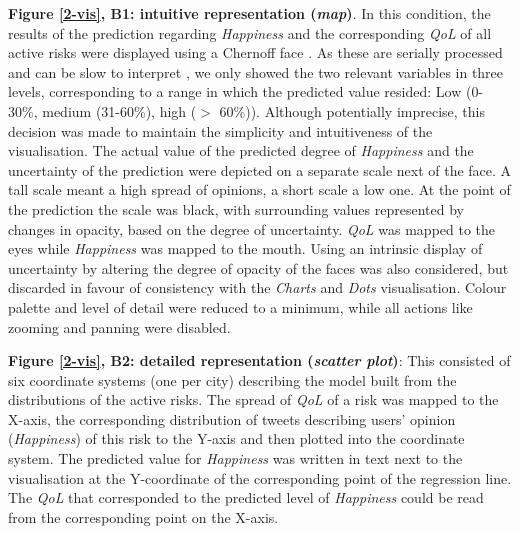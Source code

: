\documentclass[final,5p,times,twocolumn,authoryear]{elsarticle}
\begin{document}
\noindent \textbf{Figure \ref{2-vis}, B1: intuitive representation (\emph{map})}. In this condition, the results of the prediction regarding \emph{Happiness} and the corresponding \emph{QoL} of all active risks were displayed using a Chernoff face \citep{chernoff_use_1973}. As these are serially processed \citep{morris2000experimental} and can be slow to interpret \citep{umanath_multiattribute_1994}, we only showed the two relevant variables in three levels, corresponding to a range in which the predicted value resided: Low (0-30\%, medium (31-60\%), high ($>$ 60\%)). Although potentially imprecise, this decision was made to maintain the simplicity and intuitiveness of the visualisation. The actual value of the predicted degree of \emph{Happiness} and the uncertainty of the prediction were depicted on a separate scale next of the face. A tall scale meant a high spread of opinions, a short scale a low one. At the point of the prediction the scale was black, with surrounding values represented by changes in opacity, based on the degree of uncertainty. \emph{QoL} was mapped to the eyes while \emph{Happiness} was mapped to the mouth. Using an intrinsic display of uncertainty by altering the degree of opacity of the faces was also considered, but discarded in favour of consistency with the \emph{Charts} and \emph{Dots} visualisation. Colour palette and level of detail were reduced to a minimum, while all actions like zooming and panning were disabled. 

\noindent \textbf{Figure \ref{2-vis}, B2: detailed representation (\emph{scatter plot})}: This consisted of six coordinate systems (one per city) describing the model built from the distributions of the active risks. The spread of \emph{QoL} of a risk was mapped to the X-axis, the corresponding distribution of tweets describing users' opinion (\emph{Happiness}) of this risk to the Y-axis and then plotted into the coordinate system. The predicted value for \emph{Happiness} was written in text next to the visualisation at the Y-coordinate of the corresponding point of the regression line. The \emph{QoL} that corresponded to the predicted level of \emph{Happiness} could be read from the corresponding point on the X-axis.
\end{document}
